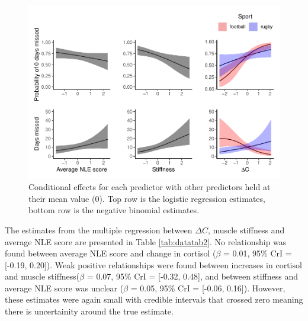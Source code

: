 \documentclass[
  english,
  man,floatsintext]{apa6}
\begin{document}
\begin{figure}[H]

{\centering \includegraphics{full_phd_files/figure-latex/hufigs-1} 

}

\caption{Conditional effects for each predictor with other predictors held at their mean value (0). Top row is the logistic regression estimates, bottom row is the negative binomial estimates.}\label{fig:hufigs}
\end{figure}

The estimates from the multiple regression between \(\Delta C\), muscle stiffness and average NLE score are presented in Table \ref{tab:datatab2}.
No relationship was found between average NLE score and change in cortisol (\(\beta\) = 0.01, 95\% CrI = {[}-0.19, 0.20{]}).
Weak positive relationships were found between increases in cortisol and muscle stiffness(\(\beta\) = 0.07, 95\% CrI = {[}-0.32, 0.48{]}, and between stiffness and average NLE score was unclear (\(\beta\) = 0.05, 95\% CrI = {[}-0.06, 0.16{]}).
However, these estimates were again small with credible intervals that crossed zero meaning there is uncertainity around the true estimate.
\end{document}

